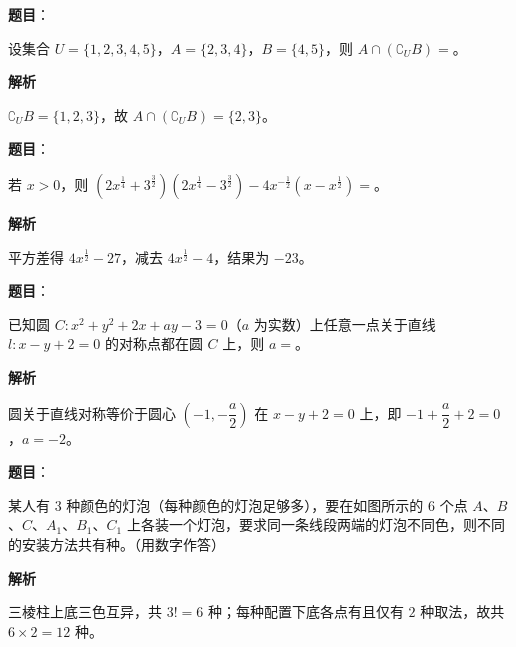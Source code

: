 \begin{answer}

\textbf{题目}：

设集合 $U=\{1,2,3,4,5\}$，$A=\{2,3,4\}$，$B=\{4,5\}$，则 $A\cap(\complement_UB)=$\gkblank{}。

\textbf{解析}

$\complement_UB=\{1,2,3\}$，故 $A\cap(\complement_UB)=\{2,3\}$。


\end{answer}
\begin{answer}

\textbf{题目}：

若 $x>0$，则 $\left(2x^{\frac14}+3^{\frac32}\right)\left(2x^{\frac14}-3^{\frac32}\right)-4x^{-\frac12}\left(x-x^{\frac12}\right)=$\gkblank{}。

\textbf{解析}

平方差得 $4x^{\frac12}-27$，减去 $4x^{\frac12}-4$，结果为 $-23$。


\end{answer}
\begin{answer}

\textbf{题目}：

已知圆 $C:x^2+y^2+2x+ay-3=0$（$a$ 为实数）上任意一点关于直线 $l:x-y+2=0$ 的对称点都在圆 $C$ 上，则 $a=$\gkblank{}。

\textbf{解析}

圆关于直线对称等价于圆心 $\left(-1,-\dfrac a2\right)$ 在 $x-y+2=0$ 上，即 $-1+\dfrac a2+2=0$，$a=-2$。


\end{answer}
\begin{answer}

\textbf{题目}：

某人有 $3$ 种颜色的灯泡（每种颜色的灯泡足够多），要在如图所示的 $6$ 个点 $A$、$B$、$C$、$A_1$、$B_1$、$C_1$ 上各装一个灯泡，要求同一条线段两端的灯泡不同色，则不同的安装方法共有\gkblank{}种。（用数字作答）
\nopagebreak[4]
\begin{center}\end{center}
\nopagebreak[4]
\textbf{解析}

三棱柱上底三色互异，共 $3!=6$ 种；每种配置下底各点有且仅有 $2$ 种取法，故共 $6\times2=12$ 种。


\end{answer}
